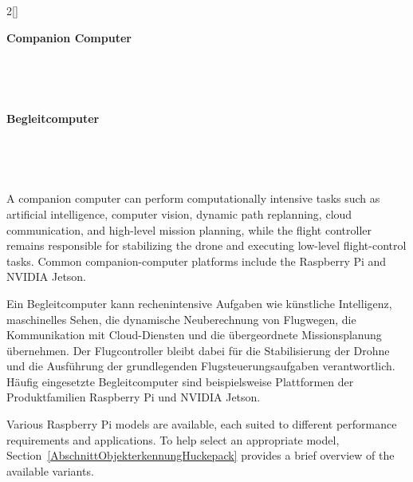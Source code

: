 \renewcommand{\deutschertitel}{Begleitcomputer}
\renewcommand{\englischertitel}{Companion Computer}
\chapter[\texorpdfstring{\protect{\vspace{2pt}\englischertitel}}{\englischertitel}]{}
\kapitel{\deutschertitel}
\thispagestyle{empty}

\label{KapitelCompanionComputer}

\begin{paracol}{2}[]

{\raggedright\huge\bfseries\sffamily \englischertitel \par\ } \\[1.8ex]

\switchcolumn

{\raggedright\huge\bfseries\sffamily \deutschertitel \par\ } \\[1.8ex]

\coleng

A companion computer can perform computationally intensive tasks such as artificial intelligence, computer vision, dynamic path replanning, cloud communication, and high-level mission planning, while the flight controller remains responsible for stabilizing the drone and executing low-level flight-control tasks. Common companion-computer platforms include the Raspberry Pi and NVIDIA Jetson.

\colger

Ein Begleitcomputer kann rechenintensive Aufgaben wie künstliche Intelligenz, maschinelles Sehen, die dynamische Neuberechnung von Flugwegen, die Kommunikation mit Cloud-Diensten und die übergeordnete Missionsplanung übernehmen. Der Flugcontroller bleibt dabei für die Stabilisierung der Drohne und die Ausführung der grundlegenden Flugsteuerungsaufgaben verantwortlich. Häufig eingesetzte Begleitcomputer sind beispielsweise Plattformen der Produktfamilien Raspberry Pi und NVIDIA Jetson.

\colende

\renewcommand{\deutschertitel}{Raspberry Pi als Begleitcomputer}
\renewcommand{\englischertitel}{Raspberry Pi as a Companion Computer}
\makroabschnitt
\label{AbschnittRaspberryPiCompanionComputer}

Various Raspberry Pi models are available, each suited to different performance requirements and applications. To help select an appropriate model, Section~\ref{AbschnittObjekterkennungHuckepack} provides a brief overview of the available variants.


\end{paracol}
